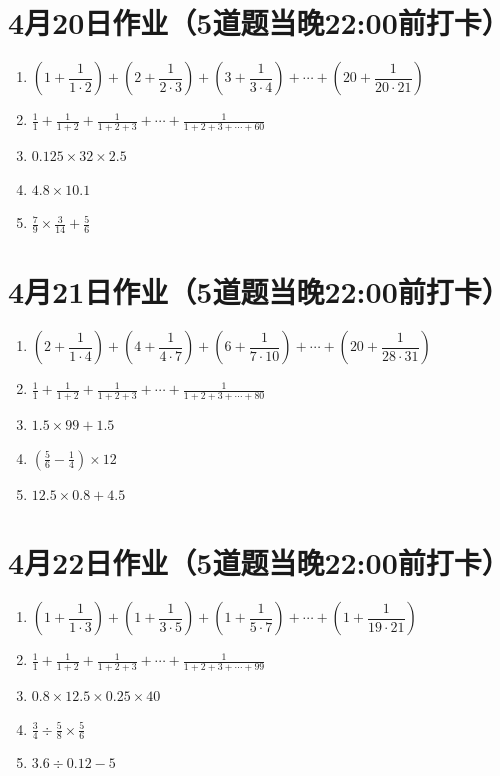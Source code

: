 \documentclass[UTF8,12pt,a4paper]{ctexart}
\newcommand{\BottomWriteSpace}{1.8cm}
\newenvironment{OnePageFiveFill}{
  \small
  \vspace*{0pt}
  \begin{enumerate}[leftmargin=*, itemsep=0pt, topsep=0pt, parsep=0pt, partopsep=0pt]
  \setlength{\parskip}{0pt}
}{
  \end{enumerate}
  \vspace*{\BottomWriteSpace}
  \normalsize
  \newpage
}
\newcommand{\Q}[1]{\item #1\par\vfill}
\newcommand{\Qlast}[1]{\item #1\par}
\begin{document}
\section*{4月20日作业（5道题当晚22:00前打卡）}
\begin{OnePageFiveFill}

\Q{$\left(1+\dfrac{1}{1\cdot2}\right) + \left(2+\dfrac{1}{2\cdot3}\right) + \left(3+\dfrac{1}{3\cdot4}\right) + \cdots + \left(20+\dfrac{1}{20\cdot21}\right)$}

\Q{$\displaystyle \frac{1}{1}+\frac{1}{1+2}+\frac{1}{1+2+3}+\cdots+\frac{1}{1+2+3+\cdots+60}$}

\Q{$0.125 \times 32 \times 2.5$}

\Q{$4.8 \times 10.1$}

\Qlast{$\displaystyle \frac{7}{9} \times \frac{3}{14} + \frac{5}{6}$}

\end{OnePageFiveFill}

\section*{4月21日作业（5道题当晚22:00前打卡）}
\begin{OnePageFiveFill}

\Q{$\left(2+\dfrac{1}{1\cdot4}\right) + \left(4+\dfrac{1}{4\cdot7}\right) + \left(6+\dfrac{1}{7\cdot10}\right) + \cdots + \left(20+\dfrac{1}{28\cdot31}\right)$}

\Q{$\displaystyle \frac{1}{1}+\frac{1}{1+2}+\frac{1}{1+2+3}+\cdots+\frac{1}{1+2+3+\cdots+80}$}

\Q{$1.5 \times 99 + 1.5$}

\Q{$\displaystyle \left(\frac{5}{6} - \frac{1}{4}\right) \times 12$}

\Qlast{$12.5 \times 0.8 + 4.5$}

\end{OnePageFiveFill}

\section*{4月22日作业（5道题当晚22:00前打卡）}
\begin{OnePageFiveFill}

\Q{$\left(1+\dfrac{1}{1\cdot3}\right) + \left(1+\dfrac{1}{3\cdot5}\right) + \left(1+\dfrac{1}{5\cdot7}\right) + \cdots + \left(1+\dfrac{1}{19\cdot21}\right)$}

\Q{$\displaystyle \frac{1}{1}+\frac{1}{1+2}+\frac{1}{1+2+3}+\cdots+\frac{1}{1+2+3+\cdots+99}$}

\Q{$0.8 \times 12.5 \times 0.25 \times 40$}

\Q{$\displaystyle \frac{3}{4} \div \frac{5}{8} \times \frac{5}{6}$}

\Qlast{$3.6 \div 0.12 - 5$}

\end{OnePageFiveFill}
\end{document}
